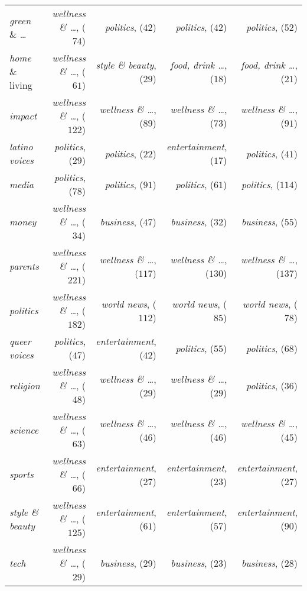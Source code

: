 \documentclass[a4paper,11pt]{article}
\begin{document}
\begin{table}[ht]
\begin{tabular}{|l||rrrr|}
  \textit{green} \& \dots & \textit{wellness \& \dots}, ($74$) & \textit{politics}, ($42$) & \textit{politics}, ($42$) & \textit{politics}, ($52$) \\ 
  \textit{home} \& living & \textit{wellness \& \dots}, ($61$) & \textit{style \& beauty}, ($29$) & \textit{food, drink \dots}, ($18$) & \textit{food, \textit{drink} \dots}, ($21$) \\ 
  \textit{impact} & \textit{wellness \& \dots}, ($122$) & \textit{wellness \& \dots}, ($89$) & \textit{wellness \& \dots}, ($73$) & \textit{wellness \& \dots}, ($91$) \\ 
  \textit{latino voices} & \textit{politics}, ($29$) & \textit{politics}, ($22$) & \textit{entertainment}, ($17$) & \textit{politics}, ($41$) \\ 
  \textit{media} & \textit{politics}, ($78$) & \textit{politics}, ($91$) & \textit{politics}, ($61$) & \textit{politics}, ($114$) \\ 
  \textit{money} & \textit{wellness \& \dots}, ($34$) & \textit{business}, ($47$) & \textit{business}, ($32$) & \textit{business}, ($55$) \\ 
  \textit{parents} & \textit{wellness \& \dots}, ($221$) & \textit{wellness \& \dots}, ($117$) & \textit{wellness \& \dots}, ($130$) & \textit{wellness \& \dots}, ($137$) \\ 
  \textit{politics} & \textit{wellness \& \dots}, ($182$) & \textit{world news}, ($112$) & \textit{world news}, ($85$) & \textit{world news}, ($78$) \\ 
  \textit{queer voices} & \textit{politics}, ($47$) & \textit{entertainment}, ($42$) & \textit{politics}, ($55$) & \textit{politics}, ($68$) \\ 
  \textit{religion} & \textit{wellness \& \dots}, ($48$) & \textit{wellness \& \dots}, ($29$) & \textit{wellness \& \dots}, ($29$) & \textit{politics}, ($36$) \\ 
  \textit{science} & \textit{wellness \& \dots}, ($63$) & \textit{wellness \& \dots}, ($46$) & \textit{wellness \& \dots}, ($46$) & \textit{wellness \& \dots}, ($45$) \\ 
  \textit{sports} & \textit{wellness \& \dots}, ($66$) & \textit{entertainment}, ($27$) & \textit{entertainment}, ($23$) & \textit{entertainment}, ($27$) \\ 
  \textit{style \& beauty} & \textit{wellness \& \dots}, ($125$) & \textit{entertainment}, ($61$) & \textit{entertainment}, ($57$) & \textit{entertainment}, ($90$) \\ 
  \textit{tech} & \textit{wellness \& \dots}, ($29$) & \textit{business}, ($29$) & \textit{business}, ($23$) & \textit{business}, ($28$) \\ 

\end{tabular}
\end{table}
\end{document}
